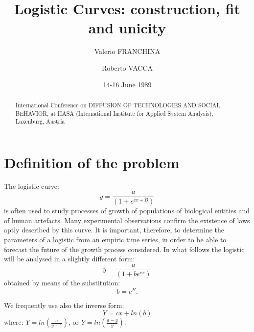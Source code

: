 \documentclass[%
 aip,
 jmp,%
 amsmath,amssymb,
 reprint,%
]{revtex4-1}
\begin{document}

\title[LOGISTIC CURVES: CONSTRUCTION, FIT  AND UNICITY]{Logistic Curves: construction, fit and unicity}%
\author{Valerio FRANCHINA}
\author{Roberto VACCA}

\date{14-16 June 1989}%

\begin{abstract}
International Conference on DIFFUSION OF  TECHNOLOGIES AND SOCIAL BEHAVIOR, at IIASA (International Institute for Applied System Analysis), Laxenburg, Austria
%
\end{abstract}

\maketitle


\section{\label{sec:level1}Definition of the problem}

The logistic curve: \[ y = \frac{a}{(1 + e^{cx + B})} \] is often used to study processes of growth of populations of  biological entities and of human artefacts. Many experimental observations  confirm the existence of laws aptly described by this curve. It is important, therefore, to  determine the parameters  of a  logistic from an empiric time series, in order to be able to forecast the  future of the growth process considered.
In what follows the logistic will be analysed in a slightly different form:
\[ y = \frac{a}{(1 + be^{cx})} \] obtained by means of the substitution: \[ b = e^B.\]

We frequently use also the inverse form:\[Y = cx + ln(b)\] where: $Y = ln(\frac{a}{y - 1})$, or $Y = ln(\frac{a - y}{y})$.\\
\end{document}
